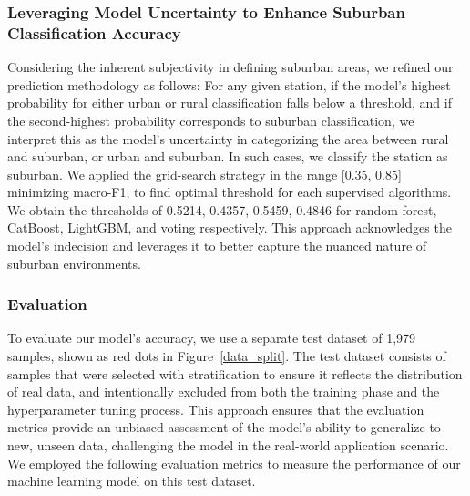 \documentclass[gmd, manuscript]{copernicus}
\begin{document}
\subsubsection{Leveraging Model Uncertainty to Enhance Suburban Classification Accuracy}
Considering the inherent subjectivity in defining suburban areas, we refined our prediction methodology as follows: For any given station, if the model's highest probability for either urban or rural classification falls below a threshold, and if the second-highest probability corresponds to suburban classification, we interpret this as the model's uncertainty in categorizing the area between rural and suburban, or urban and suburban. In such cases, we classify the station as suburban. We applied the grid-search strategy in the range [0.35, 0.85] minimizing macro-F1, to find optimal threshold for each supervised algorithms. We obtain the thresholds of 0.5214, 0.4357, 0.5459, 0.4846 for random forest, CatBoost, LightGBM, and voting respectively. This approach acknowledges the model's indecision and leverages it to better capture the nuanced nature of suburban environments.
\subsubsection{Evaluation}
To evaluate our model's accuracy, we use a separate test dataset of 1,979 samples, shown as red dots in Figure~\ref{data_split}. The test dataset consists of samples that were selected with stratification to ensure it reflects the distribution of real data, and intentionally excluded from both the training phase and the hyperparameter tuning process. This approach ensures that the evaluation metrics provide an unbiased assessment of the model's ability to generalize to new, unseen data, challenging the model in the real-world application scenario. We employed the following evaluation metrics to measure the performance of our machine learning model on this test dataset.
\end{document}
